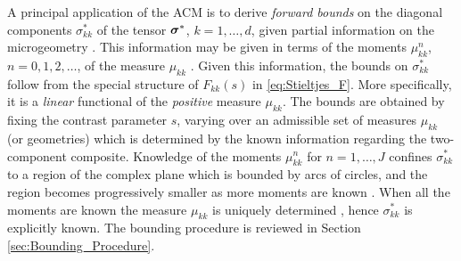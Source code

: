 \documentclass{cmslatex}
\newcommand\bsig{\mbox{\boldmath${\sigma}$}}
\begin{document}
A principal application of the ACM is to derive \emph{forward bounds}
on the diagonal components $\sigma_{kk}^*$ of the tensor $\bsig^*$,
$k=1,\ldots,d$, given partial information on the microgeometry
\cite{Bergman:PRL-1285,Milton:APL-300,Golden:CMP-473,Bergman:AP-78}. This
information may be given in terms of the moments $\mu_{kk}^n$,
$n=0,1,2,\ldots$, of the measure $\mu_{kk}$
\cite{Milton:JAP-5294,Golden:CMP-473}. Given this information, the 
bounds on $\sigma_{kk}^*$ follow from the special structure of $F_{kk}(s)$
in \eqref{eq:Stieltjes_F}. More specifically, it is a \emph{linear}
functional of the \emph{positive} measure $\mu_{kk}$.  The bounds are
obtained by fixing the contrast parameter $s$, varying over an
admissible set of measures $\mu_{kk}$ (or geometries) which is
determined by the known information regarding the two-component
composite.  Knowledge of the moments $\mu_{kk}^n$  for $n=1,\ldots,J$ confines
$\sigma_{kk}^*$ to a region of the complex plane which is bounded by arcs
of circles, and the region becomes progressively smaller as more
moments are known \cite{Milton:JAP-5294,Golden:1986:BCP}. When 
all the moments are known the measure $\mu_{kk}$ is uniquely determined 
\cite{Akhiezer:Book:1965}, hence  $\sigma_{kk}^*$ is explicitly known. The
bounding procedure is reviewed in Section
\ref{sec:Bounding_Procedure}.
\end{document}
